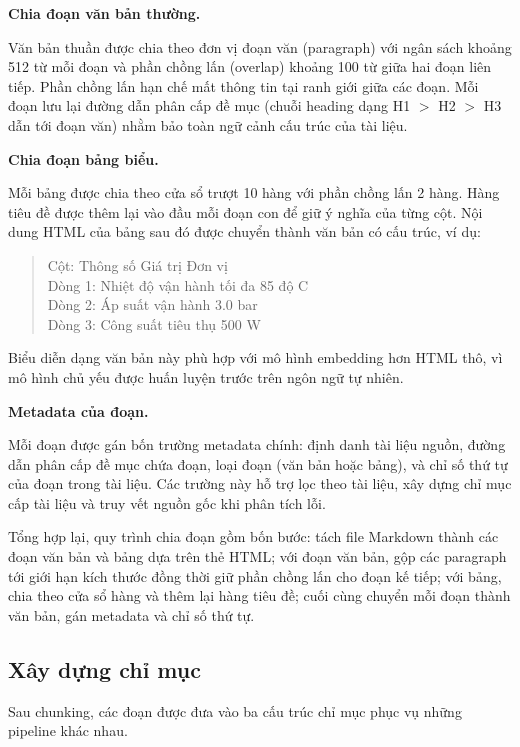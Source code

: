 \documentclass[../DoAn.tex]{subfiles}
\begin{document}
\noindent\textbf{Chia đoạn văn bản thường.}

Văn bản thuần được chia theo đơn vị đoạn văn (paragraph) với ngân sách khoảng 512 từ mỗi đoạn và phần chồng lấn (overlap) khoảng 100 từ giữa hai đoạn liên tiếp. Phần chồng lấn hạn chế mất thông tin tại ranh giới giữa các đoạn. Mỗi đoạn lưu lại đường dẫn phân cấp đề mục (chuỗi heading dạng H1 $>$ H2 $>$ H3 dẫn tới đoạn văn) nhằm bảo toàn ngữ cảnh cấu trúc của tài liệu.

\noindent\textbf{Chia đoạn bảng biểu.}

Mỗi bảng được chia theo cửa sổ trượt 10 hàng với phần chồng lấn 2 hàng. Hàng tiêu đề được thêm lại vào đầu mỗi đoạn con để giữ ý nghĩa của từng cột. Nội dung HTML của bảng sau đó được chuyển thành văn bản có cấu trúc, ví dụ:

\begin{quote}
Cột: Thông số \textbar{} Giá trị \textbar{} Đơn vị\\
Dòng 1: Nhiệt độ vận hành tối đa \textbar{} 85 \textbar{} độ C\\
Dòng 2: Áp suất vận hành \textbar{} 3.0 \textbar{} bar\\
Dòng 3: Công suất tiêu thụ \textbar{} 500 \textbar{} W
\end{quote}

Biểu diễn dạng văn bản này phù hợp với mô hình embedding hơn HTML thô, vì mô hình chủ yếu được huấn luyện trước trên ngôn ngữ tự nhiên.

\noindent\textbf{Metadata của đoạn.}

Mỗi đoạn được gán bốn trường metadata chính: định danh tài liệu nguồn, đường dẫn phân cấp đề mục chứa đoạn, loại đoạn (văn bản hoặc bảng), và chỉ số thứ tự của đoạn trong tài liệu. Các trường này hỗ trợ lọc theo tài liệu, xây dựng chỉ mục cấp tài liệu và truy vết nguồn gốc khi phân tích lỗi.

Tổng hợp lại, quy trình chia đoạn gồm bốn bước: tách file Markdown thành các đoạn văn bản và bảng dựa trên thẻ HTML; với đoạn văn bản, gộp các paragraph tới giới hạn kích thước đồng thời giữ phần chồng lấn cho đoạn kế tiếp; với bảng, chia theo cửa sổ hàng và thêm lại hàng tiêu đề; cuối cùng chuyển mỗi đoạn thành văn bản, gán metadata và chỉ số thứ tự.

\subsection{Xây dựng chỉ mục}
\label{subsection:3.2.3}

Sau chunking, các đoạn được đưa vào ba cấu trúc chỉ mục phục vụ những pipeline khác nhau.
\end{document}
